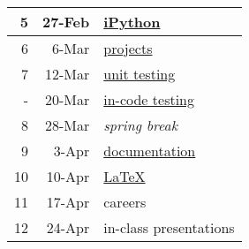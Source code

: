 \documentclass[12pt]{article}
\begin{document}
\begin{table}[htbp]
\begin{tabular}{|r|r|l|}
5  & 27-Feb & \href{https://github.com/rachelslaybaugh/ucb-ipython-intro}{iPython} \\ \hline
6  & 6-Mar & \href{https://github.com/rachelslaybaugh/NE24/blob/master/project.md}{projects} \\ \hline%
7  & 12-Mar &  \href{http://rachelslaybaugh.github.io/python-testing/}{unit testing} \\ \hline
-  & 20-Mar & \href{http://rachelslaybaugh.github.io/python-testing/}{in-code testing}\\ \hline
8  & 28-Mar & \textit{spring break} \\ \hline
9  & 3-Apr  & \href{https://github.com/rachelslaybaugh/NE24/tree/master/documentation}{documentation} \\ \hline
10 & 10-Apr & \href{https://github.com/garretchristensen/LaTeXIntro}{\LaTeX} \\ \hline
11 & 17-Apr & careers \\ \hline
12 & 24-Apr & in-class presentations \\ \hline
\end{tabular}
\end{table}
\end{document}
